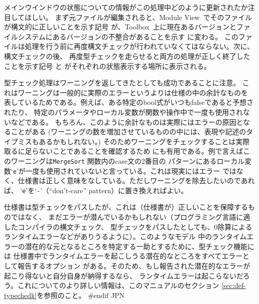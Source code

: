 \documentclass[\pformat,12pt]{article}
\newcommand{\Toolbox}{Toolbox}
\newcommand{\vdmModView}{\guicmd{Module View}}
\newcommand{\vdmModView}{\guicmd{モジュールビュー}}
\newcommand{\Toolbox}{Toolbox}
\newcommand{\vdmModView}{\guicmd{VDM View}}
\newcommand{\vdmModView}{\guicmd{VDMビュー}}
\newcommand{\guicmd}[1]{{\sf #1}}
\newcommand{\guicmd}[1]{{\gt #1}}
\begin{document}
メインウインドウの状態についての情報がこの処理中どのように更新されたか注目してほしい。
まず元ファイルが編集されると、\vdmModView\ でそのファイルが構文的に正しいことを示す記号
が、\Toolbox\ 上に現在あるバージョンとファイルシステムにあるバージョンの不整合があることを示す
に変わる。
このファイルは処理を行う前に再度構文チェックが行われていなくてはならない。次に、構文チェックの後、
再度型チェックを走らせると両方の処理が正しく終了したことを示す記号
と
がそれぞれの状態表示する場所に表示される。

型チェック処理はワーニングを返してきたとしても成功であることに注意。
これはワーニングは一般的に実際のエラーというよりは仕様の中の余計なものを
表しているためである。例えば、ある特定のbool式がいつもfalseであると予想されたり、
特定のパラメータやローカル変数が関数や操作中で一度も使用されないなどである。
もちろん、このように余計なものは実際にはエラーの原因となることがある
(ワーニングの数を増加させているものの中には、表現や記述のタイプミスもあるかもしれない。)
そのためワーニングをチェックすることは実際取るに足らないことであることを確認するため
にも有用である。例で言えばこのワーニングは{\tt MergeSort} 関数内のcase文の2番目の
パターンにあるローカル変数`{\tt e}'が一度も使用されていないと言っている。これは現実にはエラー
ではなく、仕様書は正しく意味をなしている。ただしワーニングを除去したいのであれば、
`{\tt e}'を`{\tt -}'（“don't-care” pattern）に置き換えればよい。

仕様書は型チェックをパスしたが、これは（仕様書が）正しいことを保障するものではなく、
まだエラーが潜んでいるかもしれない（プログラミング言語に適したコンパイラの構文チェック、
型チェックをパスしたとしても、0除算によるランタイムエラーなどがありうるように）。このようなモデル
中のランタイムエラーの潜在的な元となるところを特定する一助とするために、型チェック機能には
仕様書中でランタイムエラーを起こしうる潜在的なところをすべてエラーとして報告するオプション
がある。そのため、もし報告された潜在的なエラーが起こり得ないと自分自身が納得するなら、
ランタイムエラーは起こらないだろう。これについてのより詳しい情報は、このマニュアルのセクション
\ref{sec:def-typechedk}を参照のこと。
#endif JPN


% 
%
\end{document}
